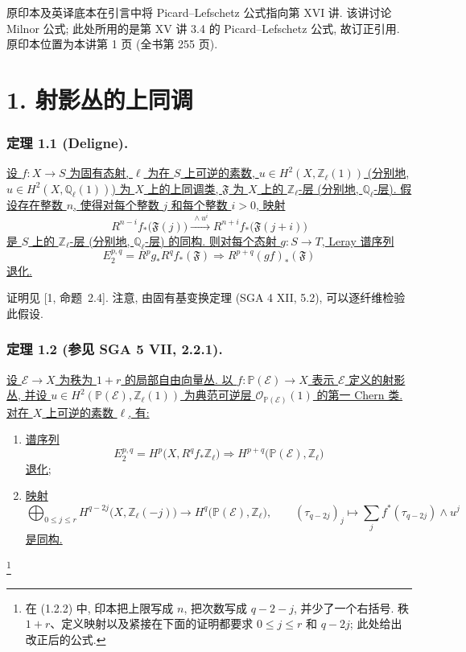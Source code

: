 \begin{editorialnote}
原印本及英译底本在引言中将 Picard--Lefschetz 公式指向第 XVI 讲. 该讲讨论 Milnor 公式; 此处所用的是第 XV 讲 3.4 的 Picard--Lefschetz 公式, 故订正引用. 原印本位置为本讲第 1 页 (全书第 255 页).
\end{editorialnote}

\section*{1. 射影丛的上同调}

\subsubsection*{定理 1.1 (Deligne).}
\underline{设 $f:X\longrightarrow S$ 为固有态射, $\ell$ 为在 $S$ 上可逆的素数, $u\in H^2(X,\mathbb Z_\ell(1))$ (分别地, $u\in H^2(X,\mathbb Q_\ell(1))$) 为 $X$ 上的上同调类, $\mathfrak F$ 为 $X$ 上的 $\mathbb Z_\ell$-层 (分别地, $\mathbb Q_\ell$-层). 假设存在整数 $n$, 使得对每个整数 $j$ 和每个整数 $i>0$, 映射}
\begin{equation}\tag{1.1.1}
R^{n-i}f_*\bigl(\mathfrak F(j)\bigr)
\xrightarrow{\ \wedge u^i\ }
R^{n+i}f_*\bigl(\mathfrak F(j+i)\bigr)
\end{equation}
\underline{是 $S$ 上的 $\mathbb Z_\ell$-层 (分别地, $\mathbb Q_\ell$-层) 的同构. 则对每个态射 $g:S\longrightarrow T$, Leray 谱序列}
\[
E_2^{p,q}=R^pg_*R^qf_*(\mathfrak F)
\Longrightarrow R^{p+q}(gf)_*(\mathfrak F)
\]
\underline{退化.}

证明见 [1, 命题~2.4]. 注意, 由固有基变换定理 (SGA 4 XII, 5.2), 可以逐纤维检验此假设.

\subsubsection*{定理 1.2 (参见 SGA 5 VII, 2.2.1).}
\underline{设 $\mathcal E\longrightarrow X$ 为秩为 $1+r$ 的局部自由向量丛. 以 $f:\mathbb P(\mathcal E)\longrightarrow X$ 表示 $\mathcal E$ 定义的射影丛, 并设 $u\in H^2(\mathbb P(\mathcal E),\mathbb Z_\ell(1))$ 为典范可逆层 $\mathcal O_{\mathbb P(\mathcal E)}(1)$ 的第一 Chern 类. 对在 $X$ 上可逆的素数 $\ell$, 有:}
\begin{enumerate}[label=\alph*)]
\item \underline{谱序列}
\begin{equation}\tag{1.2.1}
E_2^{p,q}=H^p\bigl(X,R^qf_*\mathbb Z_\ell\bigr)
\Longrightarrow
H^{p+q}\bigl(\mathbb P(\mathcal E),\mathbb Z_\ell\bigr)
\end{equation}
\underline{退化;}
\item \underline{映射}
\begin{equation}\tag{1.2.2}
\bigoplus_{0\leq j\leq r}
H^{q-2j}\bigl(X,\mathbb Z_\ell(-j)\bigr)
\longrightarrow
H^q\bigl(\mathbb P(\mathcal E),\mathbb Z_\ell\bigr),
\qquad
(\tau_{q-2j})_j\longmapsto
\sum_j f^*(\tau_{q-2j})\wedge u^j
\end{equation}
\underline{是同构.}
\end{enumerate}
\footnote{在 (1.2.2) 中, 印本把上限写成 $n$, 把次数写成 $q-2-j$, 并少了一个右括号. 秩 $1+r$、定义映射以及紧接在下面的证明都要求 $0\leq j\leq r$ 和 $q-2j$; 此处给出改正后的公式.}


